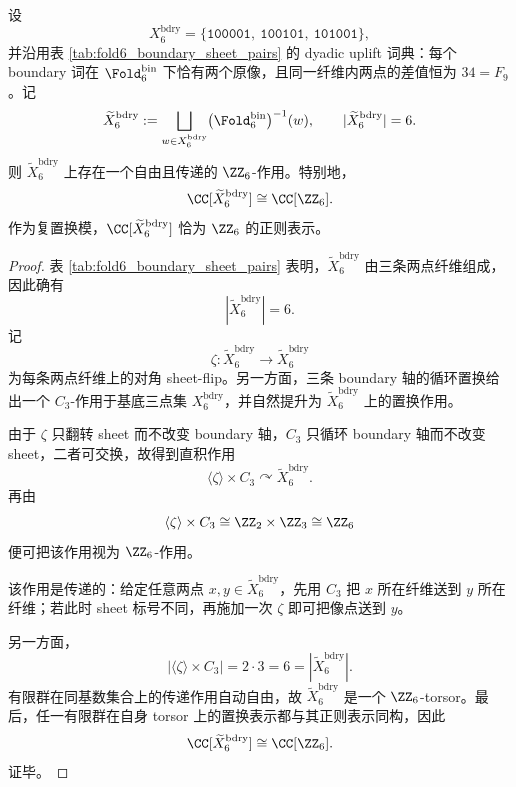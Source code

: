 \begin{theorem}\label{thm:xi-time-part53da-boundary-z6-torsor}
设
\[
X_6^{\mathrm{bdry}}
=
\{\texttt{100001},\ \texttt{100101},\ \texttt{101001}\},
\]
并沿用表 \ref{tab:fold6_boundary_sheet_pairs} 的 dyadic uplift 词典：每个 boundary 词在 \(\Fold_6^{\mathrm{bin}}\) 下恰有两个原像，且同一纤维内两点的差值恒为 \(34=F_9\)。记
\[
\widetilde X_6^{\mathrm{bdry}}
:=
\bigsqcup_{w\in X_6^{\mathrm{bdry}}}
\bigl(\Fold_6^{\mathrm{bin}}\bigr)^{-1}(w),
\qquad
|\widetilde X_6^{\mathrm{bdry}}|=6.
\]
则 \(\widetilde X_6^{\mathrm{bdry}}\) 上存在一个自由且传递的 \(\ZZ_6\)-作用。特别地，
\[
\CC[\widetilde X_6^{\mathrm{bdry}}]\cong \CC[\ZZ_6].
\]
作为复置换模，\(\CC[\widetilde X_6^{\mathrm{bdry}}]\) 恰为 \(\ZZ_6\) 的正则表示。
\end{theorem}
\begin{proof}
表 \ref{tab:fold6_boundary_sheet_pairs} 表明，\(\widetilde X_6^{\mathrm{bdry}}\) 由三条两点纤维组成，因此确有
\[
|\widetilde X_6^{\mathrm{bdry}}|=6.
\]
记
\[
\zeta:\widetilde X_6^{\mathrm{bdry}}\to \widetilde X_6^{\mathrm{bdry}}
\]
为每条两点纤维上的对角 sheet-flip。另一方面，三条 boundary 轴的循环置换给出一个 \(C_3\)-作用于基底三点集 \(X_6^{\mathrm{bdry}}\)，并自然提升为 \(\widetilde X_6^{\mathrm{bdry}}\) 上的置换作用。

由于 \(\zeta\) 只翻转 sheet 而不改变 boundary 轴，\(C_3\) 只循环 boundary 轴而不改变 sheet，二者可交换，故得到直积作用
\[
\langle\zeta\rangle\times C_3\curvearrowright \widetilde X_6^{\mathrm{bdry}}.
\]
再由
\[
\langle\zeta\rangle\times C_3
\cong
\ZZ_2\times \ZZ_3
\cong
\ZZ_6
\]
便可把该作用视为 \(\ZZ_6\)-作用。

该作用是传递的：给定任意两点 \(x,y\in \widetilde X_6^{\mathrm{bdry}}\)，先用 \(C_3\) 把 \(x\) 所在纤维送到 \(y\) 所在纤维；若此时 sheet 标号不同，再施加一次 \(\zeta\) 即可把像点送到 \(y\)。

另一方面，
\[
\bigl|\langle\zeta\rangle\times C_3\bigr|=2\cdot 3=6=|\widetilde X_6^{\mathrm{bdry}}|.
\]
有限群在同基数集合上的传递作用自动自由，故 \(\widetilde X_6^{\mathrm{bdry}}\) 是一个 \(\ZZ_6\)-torsor。最后，任一有限群在自身 torsor 上的置换表示都与其正则表示同构，因此
\[
\CC[\widetilde X_6^{\mathrm{bdry}}]\cong \CC[\ZZ_6].
\]
证毕。
\end{proof}

